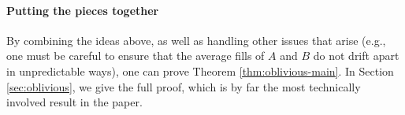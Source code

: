 \paragraph{Putting the pieces together}
By combining the ideas above, as well as handling other 
issues that arise (e.g., one must be careful to ensure that the
average fills of $A$ and $B$ do not drift apart in unpredictable
ways), one can prove Theorem \ref{thm:oblivious-main}. In Section
\ref{sec:oblivious}, we give the full proof, which is by far the most
technically involved result in the paper.



